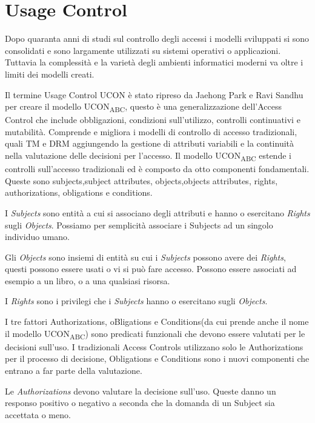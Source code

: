\section{Usage Control}
\label{sec:Usage_Control}
Dopo quaranta anni di studi sul controllo degli accessi i modelli sviluppati si sono consolidati e sono largamente utilizzati
su sistemi operativi o applicazioni. Tuttavia la complessità e la varietà degli ambienti informatici moderni va oltre i limiti
dei modelli creati.\par
Il termine Usage Control \ac{UCON} è stato ripreso da Jaehong Park e Ravi Sandhu per creare il modello UCON\textsubscript{ABC}\cite{ucon},
questo è una generalizzazione dell'Access Control che include obbligazioni, condizioni sull'utilizzo,
controlli continuativi e mutabilità. Comprende e migliora i modelli di controllo di accesso tradizionali, quali \ac{TM} e
\ac{DRM} aggiungendo la gestione di attributi variabili e la continuità nella valutazione
delle decisioni per l'accesso. Il modello UCON\textsubscript{ABC} estende i controlli sull'accesso tradizionali ed è composto da otto componenti fondamentali.
Queste sono subjects,subject attributes, objects,objects attributes, rights, authorizations, obligations e conditions.\par
{}
I \emph{Subjects} sono entità a cui si associano degli attributi e hanno o esercitano \emph{Rights} sugli \emph{Objects}. Possiamo per semplicità
associare i Subjects ad un singolo individuo umano.\par
Gli \emph{Objects} sono insiemi di entità su cui i \emph{Subjects} possono avere dei \emph{Rights}, questi possono essere usati o vi si può
fare accesso. Possono essere associati ad esempio a un libro, o a una qualsiasi risorsa.\par
I \emph{Rights} sono i privilegi che i \emph{Subjects} hanno o esercitano sugli \emph{Objects}.\par
I tre fattori Authorizations, oBligations e Conditions(da cui prende anche il
nome il modello UCON\textsubscript{ABC}) sono predicati funzionali che devono essere valutati per le decisioni sull'uso.
I tradizionali Access Controls utilizzano solo le Authorizations per il processo di decisione, Obligations e Conditions
sono i nuovi componenti che entrano a far parte della valutazione.\par
Le \emph{Authorizations} devono valutare la decisione sull'uso. Queste danno un responso positivo
o negativo a seconda che la domanda di un Subject sia accettata o meno.\par
